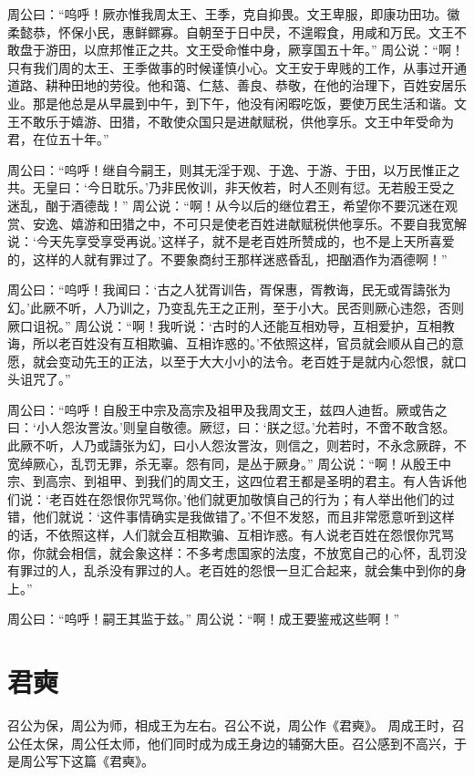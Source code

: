 \documentclass[a4paper,12pt,UTF8,twoside]{ctexbook}
\begin{document}
周公曰：“呜呼！厥亦惟我周太王、王季，克自抑畏。文王卑服，即康功田功。徽柔懿恭，怀保小民，惠鲜鳏寡。自朝至于日中昃，不遑暇食，用咸和万民。文王不敢盘于游田，以庶邦惟正之共。文王受命惟中身，厥享国五十年。”
周公说：“啊！只有我们周的太王、王季做事的时候谨慎小心。文王安于卑贱的工作，从事过开通道路、耕种田地的劳役。他和蔼、仁慈、善良、恭敬，在他的治理下，百姓安居乐业。那是他总是从早晨到中午，到下午，他没有闲暇吃饭，要使万民生活和谐。文王不敢乐于嬉游、田猎，不敢使众国只是进献赋税，供他享乐。文王中年受命为君，在位五十年。”

周公曰：“呜呼！继自今嗣王，则其无淫于观、于逸、于游、于田，以万民惟正之共。无皇曰：‘今日耽乐。’乃非民攸训，非天攸若，时人丕则有愆。无若殷王受之迷乱，酗于酒德哉！”
周公说：“啊！从今以后的继位君王，希望你不要沉迷在观赏、安逸、嬉游和田猎之中，不可只是使老百姓进献赋税供他享乐。不要自我宽解说：‘今天先享受享受再说。’这样子，就不是老百姓所赞成的，也不是上天所喜爱的，这样的人就有罪过了。不要象商纣王那样迷惑昏乱，把酗酒作为酒德啊！”

周公曰：“呜呼！我闻曰：‘古之人犹胥训告，胥保惠，胥教诲，民无或胥譸张为幻。’此厥不听，人乃训之，乃变乱先王之正刑，至于小大。民否则厥心违怨，否则厥口诅祝。”
周公说：“啊！我听说：‘古时的人还能互相劝导，互相爱护，互相教诲，所以老百姓没有互相欺骗、互相诈惑的。’不依照这样，官员就会顺从自己的意愿，就会变动先王的正法，以至于大大小小的法令。老百姓于是就内心怨恨，就口头诅咒了。”

周公曰：“呜呼！自殷王中宗及高宗及祖甲及我周文王，兹四人迪哲。厥或告之曰：‘小人怨汝詈汝。’则皇自敬德。厥愆，曰：‘朕之愆。’允若时，不啻不敢含怒。此厥不听，人乃或譸张为幻，曰小人怨汝詈汝，则信之，则若时，不永念厥辟，不宽绰厥心，乱罚无罪，杀无辜。怨有同，是丛于厥身。”
周公说：“啊！从殷王中宗、到高宗、到祖甲、到我们的周文王，这四位君王都是圣明的君主。有人告诉他们说：‘老百姓在怨恨你咒骂你。’他们就更加敬慎自己的行为；有人举出他们的过错，他们就说：‘这件事情确实是我做错了。’不但不发怒，而且非常愿意听到这样的话，不依照这样，人们就会互相欺骗、互相诈惑。有人说老百姓在怨恨你咒骂你，你就会相信，就会象这样：不多考虑国家的法度，不放宽自己的心怀，乱罚没有罪过的人，乱杀没有罪过的人。老百姓的怨恨一旦汇合起来，就会集中到你的身上。”

周公曰：“呜呼！嗣王其监于兹。”
周公说：“啊！成王要鉴戒这些啊！”

\chapter{君奭}

召公为保，周公为师，相成王为左右。召公不说，周公作《君奭》。
周成王时，召公任太保，周公任太师，他们同时成为成王身边的辅弼大臣。召公感到不高兴，于是周公写下这篇《君奭》。
\end{document}
